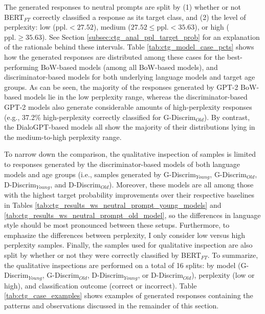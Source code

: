 The generated responses to neutral prompts are split by (1) whether or not BERT$_{FT}$ correctly classified a response as its target class, and (2) the level of perplexity: low ($\text{ppl.} < 27.52$), medium ($27.52 \leq \text{ppl.} < 35.63$), or high ($\text{ppl.} \geq 35.63$). See Section \ref{subsec:ctg_anal_ppl_target_prob} for an explanation of the rationale behind these intervals. Table \ref{tab:ctg_model_case_pcts} shows how the generated responses are distributed among these cases for the best-performing BoW-based models (among all BoW-based models), and discriminator-based models for both underlying language models and target age groups. As can be seen, the majority of the responses generated by GPT-2 BoW-based models lie in the low perplexity range, whereas the discriminator-based GPT-2 models also generate considerable amounts of high-perplexity responses (e.g., 37.2\% high-perplexity correctly classified for G-Discrim$_{Old}$). By contrast, the DialoGPT-based models all show the majority of their distributions lying in the medium-to-high perplexity range.

To narrow down the comparison, the qualitative inspection of samples is limited to responses generated by the discriminator-based models of both language models and age groups (i.e., samples generated by G-Discrim$_{Young}$, G-Discrim$_{Old}$, D-Discrim$_{Young}$, and D-Discrim$_{Old}$). Moreover, these models are all among those with the highest target probability improvements over their respective baselines in Tables \ref{tab:ctg_results_ws_neutral_prompt_young_models} and \ref{tab:ctg_results_ws_neutral_prompt_old_model}, so the differences in language style should be most pronounced between these setups. Furthermore, to emphasize the differences between perplexity, I only consider low versus high perplexity samples. Finally, the samples used for qualitative inspection are also split by whether or not they were correctly classified by BERT$_{FT}$. To summarize, the qualitative inspections are performed on a total of 16 splits: by model (G-Discrim$_{Young}$, G-Discrim$_{Old}$, D-Discrim$_{Young}$, or D-Discrim$_{Old}$), perplexity (low or high), and classification outcome (correct or incorrect). Table \ref{tab:ctg_case_examples} shows examples of generated responses containing the patterns and observations discussed in the remainder of this section.

